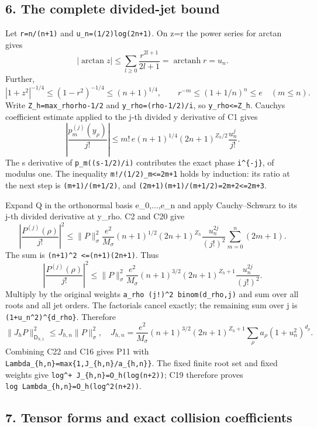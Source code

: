 \documentclass[11pt]{article}
\begin{document}
\subsection{6. The complete divided-jet bound}\label{the-complete-divided-jet-bound}

Let \texttt{r=n/(n+1)} and \texttt{u\_n=(1/2)log(2n+1)}. On \textbar z\textbar=r the power series for arctan gives \[
|\arctan z|\le\sum_{l\ge0}\frac{r^{2l+1}}{2l+1}
=\operatorname{arctanh}r=u_n.
\] Further, \[
|1+z^2|^{-1/4}\le(1-r^2)^{-1/4}\le(n+1)^{1/4},
\qquad r^{-m}\le(1+1/n)^n\le e\quad(m\le n).
\] Write \texttt{Z\_h=max\_rho\textbar{}rho-1/2\textbar{}} and \texttt{y\_rho=(rho-1/2)/i}, so \texttt{\textbar{}y\_rho\textbar{}\textless{}=Z\_h}. Cauchy\textquotesingle s coefficient estimate applied to the j-th divided y derivative of C1 gives \[
\left|\frac{p_m^{(j)}(y_\rho)}{j!}\right|
\le m!\,e(n+1)^{1/4}(2n+1)^{Z_h/2}\frac{u_n^j}{j!}.
\tag{C20}
\] The s derivative of \texttt{p\_m((s-1/2)/i)} contributes the exact phase \texttt{i\^{}\{-j\}}, of modulus one. The inequality \texttt{m!/(1/2)\_m\textless{}=2m+1} holds by induction: its ratio at the next step is \texttt{(m+1)/(m+1/2)}, and \texttt{(2m+1)(m+1)/(m+1/2)=2m+2\textless{}=2m+3}.

Expand Q in the orthonormal basis e\_0,...,e\_n and apply Cauchy--Schwarz to its j-th divided derivative at y\_rho. C2 and C20 give \[
\left|\frac{P^{(j)}(\rho)}{j!}\right|^2
\le\|P\|_\sigma^2\frac{e^2}{M_\sigma}(n+1)^{1/2}
(2n+1)^{Z_h}\frac{u_n^{2j}}{(j!)^2}
 \sum_{m=0}^n(2m+1).
\] The sum is \texttt{(n+1)\^{}2\ \textless{}=(n+1)(2n+1)}. Thus \[
\left|\frac{P^{(j)}(\rho)}{j!}\right|^2
\le\|P\|_\sigma^2\frac{e^2}{M_\sigma}(n+1)^{3/2}
(2n+1)^{Z_h+1}\frac{u_n^{2j}}{(j!)^2}.
\tag{C21}
\] Multiply by the original weights \texttt{a\_rho\ (j!)\^{}2\ binom(d\_rho,j)} and sum over all roots and all jet orders. The factorials cancel exactly; the remaining sum over j is \texttt{(1+u\_n\^{}2)\^{}\{d\_rho\}}. Therefore \[
\|J_hP\|_{\mathsf D_{h,1}}^2\le J_{h,n}\|P\|_\sigma^2,
\quad
J_{h,n}=\frac{e^2}{M_\sigma}(n+1)^{3/2}(2n+1)^{Z_h+1}
 \sum_\rho a_\rho(1+u_n^2)^{d_\rho}.
\tag{C22}
\] Combining C22 and C16 gives P11 with \texttt{Lambda\_\{h,n\}=max\{1,J\_\{h,n\}/a\_\{h,n\}\}}. The fixed finite root set and fixed weights give \texttt{log\^{}+\ J\_\{h,n\}=O\_h(log(n+2))}; C19 therefore proves \texttt{log\ Lambda\_\{h,n\}=O\_h(log\^{}2(n+2))}.

\subsection{7. Tensor forms and exact collision coefficients}\label{tensor-forms-and-exact-collision-coefficients}
\end{document}
